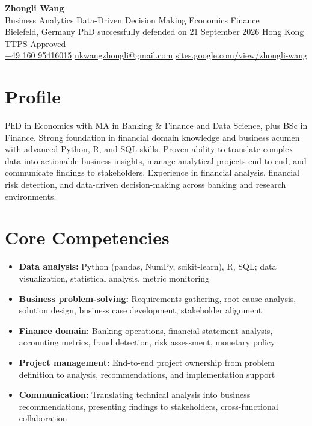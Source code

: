 \documentclass[a4paper,11pt]{article}
\begin{document}
\begin{center}
  {\LARGE\textbf{\textcolor{accent}{Zhongli Wang}}}\\[3pt]
  {\large Business Analytics \textbar{} Data-Driven Decision Making \textbar{} Economics \textbar{} Finance}\\[3pt]
  Bielefeld, Germany \textbar{} PhD successfully defended on 21 September 2026 \textbar{} Hong Kong TTPS Approved \\[2pt]
  \href{tel:+4916095416015}{+49 160 95416015} \textbar{}
  \href{mailto:nkwangzhongli@gmail.com}{nkwangzhongli@gmail.com} \textbar{}
  \href{https://sites.google.com/view/zhongli-wang/}{sites.google.com/view/zhongli-wang}
\end{center}

\section{Profile}
PhD in Economics with MA in Banking \& Finance and Data Science, plus BSc in Finance. Strong foundation in financial domain knowledge and business acumen with advanced Python, R, and SQL skills. Proven ability to translate complex data into actionable business insights, manage analytical projects end-to-end, and communicate findings to stakeholders. Experience in financial analysis, financial risk detection, and data-driven decision-making across banking and research environments.

\section{Core Competencies}
\begin{itemize}
  \item \textbf{Data analysis:} Python (pandas, NumPy, scikit-learn), R, SQL; data visualization, statistical analysis, metric monitoring
  \item \textbf{Business problem-solving:} Requirements gathering, root cause analysis, solution design, business case development, stakeholder alignment
  \item \textbf{Finance domain:} Banking operations, financial statement analysis, accounting metrics, fraud detection, risk assessment, monetary policy
  \item \textbf{Project management:} End-to-end project ownership from problem definition to analysis, recommendations, and implementation support
  \item \textbf{Communication:} Translating technical analysis into business recommendations, presenting findings to stakeholders, cross-functional collaboration
\end{itemize}
\end{document}
